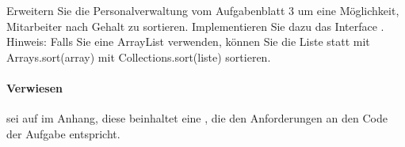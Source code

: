 Erweitern Sie die Personalverwaltung vom Aufgabenblatt 3 um eine Möglichkeit, Mitarbeiter nach Gehalt zu sortieren.
Implementieren Sie dazu das Interface .
Hinweis: Falls Sie eine ArrayList verwenden, können Sie die Liste statt mit Arrays.sort(array) mit Collections.sort(liste) sortieren.

\paragraph{Verwiesen} sei auf  im Anhang, diese beinhaltet eine , die den Anforderungen an den Code der Aufgabe entspricht.
